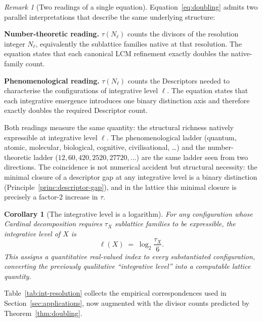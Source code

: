 \documentclass[11pt,a4paper]{article}
\newtheorem{corollary}[theorem]{Corollary}
\theoremstyle{definition}
\theoremstyle{remark}
\newtheorem{remark}[theorem]{Remark}
\begin{document}
\begin{remark}[Two readings of a single equation]\label{rem:two-readings}
Equation~\eqref{eq:doubling} admits two parallel interpretations that describe the same underlying structure:

\textbf{Number-theoretic reading.} $\tau(N_{\ell})$ counts the divisors of the resolution integer $N_{\ell}$, equivalently the sublattice families native at that resolution. The equation states that each canonical LCM refinement exactly doubles the native-family count.

\textbf{Phenomenological reading.} $\tau(N_{\ell})$ counts the Descriptors needed to characterise the configurations of integrative level $\ell$. The equation states that each integrative emergence introduces one binary distinction axis and therefore exactly doubles the required Descriptor count.

Both readings measure the same quantity: the structural richness natively expressible at integrative level $\ell$. The phenomenological ladder (quantum, atomic, molecular, biological, cognitive, civilisational, \ldots) and the number-theoretic ladder ($12, 60, 420, 2520, 27720, \ldots$) are the same ladder seen from two directions. The coincidence is not numerical accident but structural necessity: the minimal closure of a descriptor gap at any integrative level is a binary distinction (Principle~\ref{princ:descriptor-gap}), and in the lattice this minimal closure is precisely a factor-$2$ increase in $\tau$.
\end{remark}

\begin{corollary}[The integrative level is a logarithm]\label{cor:level-log}
For any configuration whose Cardinal decomposition requires $\tau_{X}$ sublattice families to be expressible, the integrative level of $X$ is
\[
\ell(X) \;=\; \log_{2}\!\frac{\tau_{X}}{6}.
\]
This assigns a quantitative real-valued index to every substantiated configuration, converting the previously qualitative ``integrative level'' into a computable lattice quantity.
\end{corollary}

Table~\ref{tab:int-resolution} collects the empirical correspondences used in Section~\ref{sec:applications}, now augmented with the divisor counts predicted by Theorem~\ref{thm:doubling}.
\end{document}
